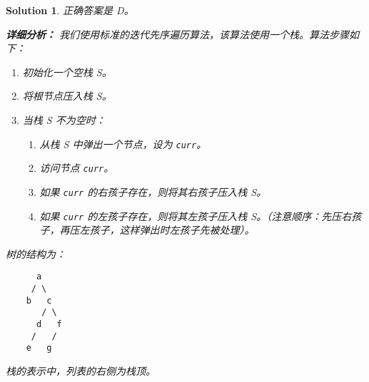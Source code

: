 \documentclass[UTF8]{report}
\newtheorem{solution}{Solution}
\theoremstyle{MyLineTheoremStyle} %
\theoremstyle{MyBlockTheoremStyle} %
\theoremstyle{MySubsubsectionStyle} %
\begin{document}
\begin{solution}
正确答案是 D。

\textbf{详细分析：}
我们使用标准的迭代先序遍历算法，该算法使用一个栈。算法步骤如下：
\begin{enumerate}
    \item 初始化一个空栈 S。
    \item 将根节点压入栈 S。
    \item 当栈 S 不为空时：
    \begin{enumerate}
        \item 从栈 S 中弹出一个节点，设为 \texttt{curr}。
        \item 访问节点 \texttt{curr}。
        \item 如果 \texttt{curr} 的右孩子存在，则将其右孩子压入栈 S。
        \item 如果 \texttt{curr} 的左孩子存在，则将其左孩子压入栈 S。（注意顺序：先压右孩子，再压左孩子，这样弹出时左孩子先被处理）。
    \end{enumerate}
\end{enumerate}

树的结构为：
\begin{verbatim}
      a
     / \
    b   c
       / \
      d   f
     /   /
    e   g
\end{verbatim}
栈的表示中，列表的右侧为栈顶。


\end{solution}
\end{document}
